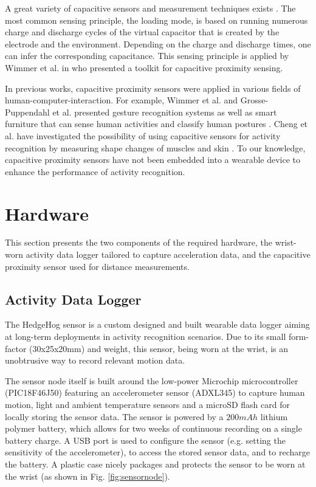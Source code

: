 \documentclass[runningheads,a4paper]{llncs}
\begin{document}
A great variety of capacitive sensors and measurement techniques exists \cite{Smith1999}. The most common sensing principle, the loading mode, is based on running numerous charge and discharge cycles of the virtual capacitor that is created by the electrode and the environment. Depending on the charge and discharge times, one can infer the corresponding capacitance. This sensing principle is applied by Wimmer et al. in \cite{Wimmer2007} who presented a toolkit for capacitive proximity sensing.

In previous works, capacitive proximity sensors were applied in various fields of human-computer-interaction. For example, Wimmer et al. and Grosse-Puppendahl et al. presented gesture recognition systems \cite{Wimmer,Grosse-puppendahl2012} as well as smart furniture that can sense human activities \cite{Wimmer} and classify human postures \cite{Grosse-puppendahl2011}. Cheng et al. have investigated the possibility of using capacitive sensors for activity recognition by measuring shape changes of muscles and skin \cite{Cheng2010}. To our knowledge, capacitive proximity sensors have not been embedded into a wearable device to enhance the performance of activity recognition.


\section{Hardware}
\label{sect:hardware}
This section presents the two components of the required hardware, the wrist-worn activity data logger tailored to capture acceleration data, and the capacitive proximity sensor used for distance measurements.

\subsection{Activity Data Logger}
The HedgeHog sensor is a custom designed and built wearable data logger aiming at long-term deployments in activity recognition scenarios. Due to its small form-factor (30x25x20mm) and weight, this sensor, being worn at the wrist, is an unobtrusive way to record relevant motion data.

The sensor node itself is built around the low-power Microchip microcontroller (PIC18F46J50) featuring an accelerometer sensor (ADXL345) to capture human motion, light and ambient temperature sensors and a microSD flash card for locally storing the sensor data. The sensor is powered by a $200mAh$ lithium polymer battery, which allows for two weeks of continuous recording on a single battery charge. A USB port is used to configure the sensor (e.g. setting the sensitivity of the accelerometer), to access the stored sensor data, and to recharge the battery. A plastic case nicely packages and protects the sensor to be worn at the wrist (as shown in Fig. \ref{fig:sensornode}).
\end{document}

